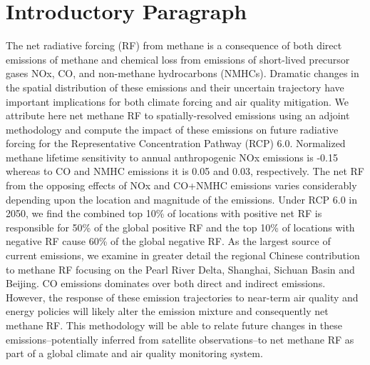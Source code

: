 \section*{Introductory Paragraph}

The net radiative forcing (RF) from methane is a consequence of both direct emissions of methane and chemical loss from emissions of short-lived precursor gases NOx, CO, and non-methane hydrocarbons (NMHCs). Dramatic changes in the spatial distribution of these emissions and their uncertain trajectory have important implications for both climate forcing and air quality mitigation.  We attribute here net methane RF  to spatially-resolved emissions using an adjoint methodology and compute the impact of these emissions on future radiative forcing for the Representative Concentration Pathway (RCP) 6.0.  Normalized methane lifetime sensitivity  to annual anthropogenic NOx emissions is -0.15 whereas to CO and NMHC emissions it is 0.05 and 0.03, respectively. The net RF from the opposing effects of NOx and CO+NMHC emissions varies considerably depending upon the location and magnitude of the emissions.  Under RCP 6.0 in 2050,  we find the combined top 10\% of locations with positive net RF is responsible for 50\% of the global positive RF and the top 10\% of locations with negative RF cause 60\% of the global negative RF. As the largest source of current emissions, we examine in greater detail the regional Chinese contribution to methane RF focusing on the Pearl River Delta, Shanghai, Sichuan Basin and Beijing.  CO emissions dominates over both direct and indirect emissions. However, the response of these emission trajectories to near-term air quality and energy policies will likely alter the emission mixture and consequently net methane RF. This methodology will be able to relate future changes in these emissions--potentially inferred from satellite observations--to net methane RF  as part of a global climate and air quality monitoring system. 